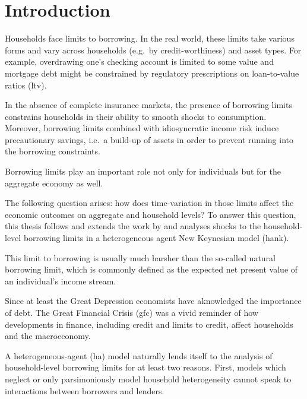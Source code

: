 \documentclass[12pt]{article}
\numberwithin{equation}{section} %
\begin{document}
\newpage
{} %
\pagestyle{fancy}
\fancyhf{}
\fancyhead[C]{\leftmark}
\fancyfoot[C]{\thepage}
\thispagestyle{plain}
\section{Introduction}
\label{sec:introduction}

Households face limits to borrowing. In the real world, these limits take various forms and vary across households (e.g.~by credit-worthiness) and asset types. For example, overdrawing one's checking account is limited to some value and mortgage debt might be constrained by regulatory prescriptions on loan-to-value ratios (\Gls{ltv}). 

In the absence of complete insurance markets, the presence of borrowing limits constrains households in their ability to smooth shocks to consumption. Moreover, borrowing limits combined with idiosyncratic income risk induce precautionary savings, i.e.~a build-up of assets in order to prevent running into the borrowing constraints. 

Borrowing limits play an important role not only for individuals but for the aggregate economy as well.

The following question arises: how does time-variation in those limits affect the economic outcomes on aggregate and household levels? To answer this question, this thesis follows and extends the work by \textcite{gl2017} and analyses shocks to the household-level borrowing limits in a heterogeneous agent New Keynesian model (\Gls{hank}).

This limit to borrowing is usually much harsher than the so-called natural borrowing limit, which is commonly defined as the expected net present value of an individual's income stream. 

Since at least the Great Depression economists have aknowledged the importance of debt. The Great Financial Crisis (\Gls{gfc}) was a vivid reminder of how developments in finance, including credit and limits to credit, affect households and the macroeconomy. 

A heterogeneous-agent (\Gls{ha}) model naturally lends itself to the analysis of household-level borrowing limits for at least two reasons. First, models which neglect or only parsimoniously model household heterogeneity cannot speak to interactions between borrowers and lenders.
\end{document}
